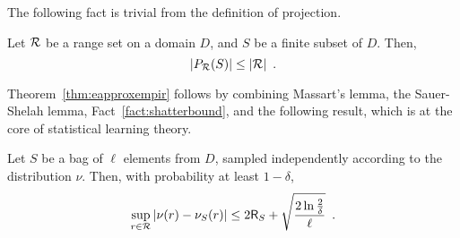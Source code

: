 The following fact is trivial from the definition of projection.
\begin{fact}\label{fact:shatterbound}
	Let $\mathcal{R}$ be a range set on a domain $D$, and $S$ be a finite subset of
	$D$. Then,
	\[
		|P_{\mathcal{R}}(S)|\le |\mathcal{R}|\enspace.
	\]
\end{fact}

Theorem~\ref{thm:eapproxempir} follows by combining Massart's lemma, the
Sauer-Shelah lemma, Fact~\ref{fact:shatterbound}, and the following
result, which is at the core of statistical learning theory.

\begin{theorem}
	Let $S$ be a bag of $\ell$ elements from $D$, sampled independently
	according to the distribution $\nu$.  Then, with probability at least
	$1-\delta$,
	\[
		\sup_{r\in\mathcal{R}}|\nu(r)-\nu_S(r)|\le 2 \mathsf{R}_S
		+\sqrt{\frac{2\ln\frac{2}{\delta}}{\ell}}\enspace.
	\]
\end{theorem}

